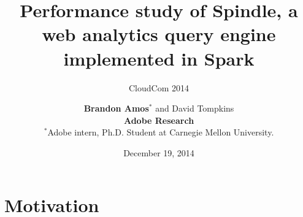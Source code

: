 \documentclass{beamer}
\begin{document}
\title[Spindle, CloudCom 2014]{
  {\Large Performance study of Spindle, a web analytics
    query engine implemented in Spark}
  }
\subtitle{
  CloudCom 2014
}
\author[Amos and Tompkins, Adobe Research]{
  {\bf Brandon Amos$^*$} and David Tompkins \\
  {\bf Adobe Research } \\
  {\footnotesize
    $^*$Adobe intern, Ph.D. Student at
    Carnegie Mellon University.} \\[4mm]
  \vspace*{-5mm}
}
\date{December 19, 2014}
{\frame{\titlepage}}
\addtocounter{framenumber}{-1}
\frame{\tableofcontents}\addtocounter{framenumber}{-1}

\section{Motivation}
\frame{\tableofcontents[currentsection]}
\end{document}
